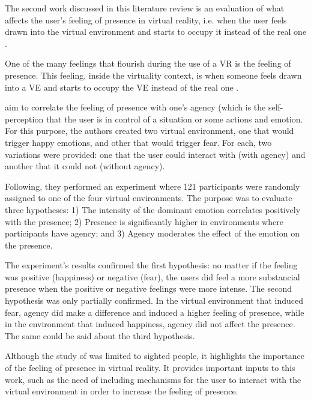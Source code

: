 The second work discussed in this literature review is an evaluation of what affects the user’s feeling of presence in virtual reality, i.e. when the user feels drawn into the virtual environment and starts to occupy it instead of the real one \cite{cummings2016immersive}.

One of the many feelings that flourish during the use of a VR is the feeling of presence. This feeling, inside the virtuality context, is when someone feels drawn into a VE and starts to occupy the VE instead of the real one \cite{cummings2016immersive}.

 aim to correlate the feeling of presence with one’s agency (which is the self-perception that the user is in control of a situation or some actions \cite{farrer2002experiencing} and emotion. For this purpose, the authors created two virtual environment, one that would trigger happy emotions, and other that would trigger fear. For each, two variations were provided: one that the user could interact with (with agency) and another that it could not (without agency).

Following, they performed an experiment where 121 participants were randomly assigned to one of the four virtual environments. The purpose was to evaluate three hypotheses: 1) The intensity of the dominant emotion correlates positively with the presence; 2) Presence is significantly higher in environments where participants have agency; and 3) Agency moderates the effect of the emotion on the presence.

The experiment's results confirmed the first hypothesis: no matter if the feeling was positive (happiness) or negative (fear), the users did feel a more substancial presence when the positive or negative feelings were more intense. The second hypothesis was only partially confirmed. In the virtual environment that induced fear, agency did make a difference and induced a higher feeling of presence, while in the environment that induced happiness, agency did not affect the presence. The same could be said about the third hypothesis.

Although the study of  was limited to sighted people, it highlights the importance of the feeling of presence in virtual reality. It provides important inputs to this work, such as the need of including mechanisms for the user to interact with the virtual environment in order to increase the feeling of presence. 

